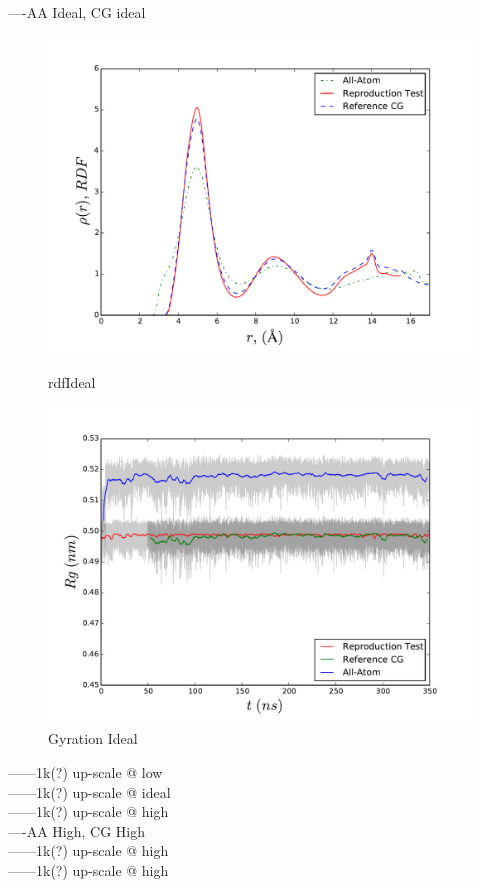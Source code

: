 \documentclass[10pt,a4paper,twoside]{article}
\begin{document}
  ----AA Ideal, CG ideal\\
     \begin{figure}[ht!]
  \begin{center}
	\includegraphics[width=1 \textwidth]{./graphs/rdfI}
	\caption{rdfIdeal}
		\includegraphics[width=1 \textwidth]{./graphs/GyraI}
	\caption{Gyration Ideal}
	\label{gfx:rdfI}
	\end{center}
	\end{figure}
   ------1k(?) up-scale @ low\\
   ------1k(?) up-scale @ ideal\\
   ------1k(?) up-scale @ high  \\
  ----AA High, CG High\\
   ------1k(?) up-scale @ high\\
   ------1k(?) up-scale @ high
\end{document}
